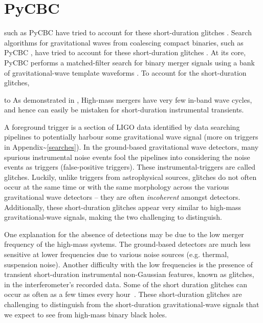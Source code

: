 \documentclass[%
 reprint,
 amsmath,amssymb,
 aps,
]{revtex4}
\newcommand{\pycbc}{{\sc PyCBC}\xspace}
\begin{document}
\section{PyCBC}



 such as \pycbc \cite{pycbc_code} have tried to account for these short-duration glitches \cite{pycbc_short_duration_transients}. 
Search algorithms for gravitational waves from coalescing compact binaries, such as PyCBC \cite{pycbc_code}, have tried to account for these short-duration glitches \cite{pycbc_short_duration_transients}. At its core, PyCBC performs a matched-filter search for binary merger signals using a bank of gravitational-wave template waveforms \cite{pycbc_og0, pycbc_og1, pycbc_og2, pycbc_og3, pycbc_og4, pycbc_og5}.  To account for the short-duration glitches, 


 to As demonstrated in \citet{blip_glitches},  High-mass mergers have
very few in-band wave cycles, and hence can easily be mistaken for short-duration instrumental transients.




A foreground trigger is a section of LIGO data identified by data searching pipelines to potentially harbour some
gravitational wave signal (more on triggers in Appendix\textasciitilde\ref{searches}). In the ground-based gravitational wave
detectors, many spurious instrumental noise events fool the pipelines into considering the noise events as triggers
(false-positive triggers). These instrumental-triggers are called glitches. Luckily, unlike triggers from astrophysical
sources, glitches do not often occur at the same time or with the same morphology across the various gravitational wave
detectors -- they are often \emph{incoherent} amongst detectors. Additionally, these short-duration glitches appear very
similar to high-mass gravitational-wave signals, making the two challenging to distinguish.


One explanation for the absence of detections may be due to the low merger frequency of the high-mass systems. The ground-based detectors are much less sensitive at lower frequencies due to various noise sources (e.g. thermal, suspension noise). Another difficulty with the low frequencies is the presence of transient short-duration instrumental non-Gaussian features, known as glitches, in the interferometer's recorded data. Some of the short duration glitches can occur as often as a few times every hour~\cite{blipGlitches}. These short-duration glitches are challenging to distinguish from the short-duration gravitational-wave signals that we expect to see from high-mass binary black holes. 
\end{document}
